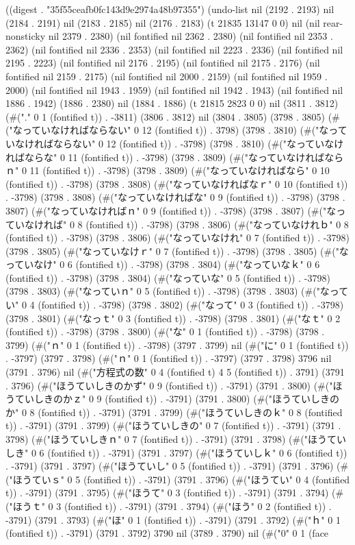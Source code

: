 
((digest . "35f55ceafb0fc143d9e2974a48b97355") (undo-list nil (2192 . 2193) nil (2184 . 2191) nil (2183 . 2185) nil (2176 . 2183) (t 21835 13147 0 0) nil (nil rear-nonsticky nil 2379 . 2380) (nil fontified nil 2362 . 2380) (nil fontified nil 2353 . 2362) (nil fontified nil 2336 . 2353) (nil fontified nil 2223 . 2336) (nil fontified nil 2195 . 2223) (nil fontified nil 2176 . 2195) (nil fontified nil 2175 . 2176) (nil fontified nil 2159 . 2175) (nil fontified nil 2000 . 2159) (nil fontified nil 1959 . 2000) (nil fontified nil 1943 . 1959) (nil fontified nil 1942 . 1943) (nil fontified nil 1886 . 1942) (1886 . 2380) nil (1884 . 1886) (t 21815 2823 0 0) nil (3811 . 3812) (#("." 0 1 (fontified t)) . -3811) (3806 . 3812) nil (3804 . 3805) (3798 . 3805) (#("なっていなければならない" 0 12 (fontified t)) . 3798) (3798 . 3810) (#("なっていなければならない" 0 12 (fontified t)) . -3798) (3798 . 3810) (#("なっていなければならな" 0 11 (fontified t)) . -3798) (3798 . 3809) (#("なっていなければならｎ" 0 11 (fontified t)) . -3798) (3798 . 3809) (#("なっていなければなら" 0 10 (fontified t)) . -3798) (3798 . 3808) (#("なっていなければなｒ" 0 10 (fontified t)) . -3798) (3798 . 3808) (#("なっていなければな" 0 9 (fontified t)) . -3798) (3798 . 3807) (#("なっていなければｎ" 0 9 (fontified t)) . -3798) (3798 . 3807) (#("なっていなければ" 0 8 (fontified t)) . -3798) (3798 . 3806) (#("なっていなけれｂ" 0 8 (fontified t)) . -3798) (3798 . 3806) (#("なっていなけれ" 0 7 (fontified t)) . -3798) (3798 . 3805) (#("なっていなけｒ" 0 7 (fontified t)) . -3798) (3798 . 3805) (#("なっていなけ" 0 6 (fontified t)) . -3798) (3798 . 3804) (#("なっていなｋ" 0 6 (fontified t)) . -3798) (3798 . 3804) (#("なっていな" 0 5 (fontified t)) . -3798) (3798 . 3803) (#("なっていｎ" 0 5 (fontified t)) . -3798) (3798 . 3803) (#("なってい" 0 4 (fontified t)) . -3798) (3798 . 3802) (#("なって" 0 3 (fontified t)) . -3798) (3798 . 3801) (#("なっｔ" 0 3 (fontified t)) . -3798) (3798 . 3801) (#("なｔ" 0 2 (fontified t)) . -3798) (3798 . 3800) (#("な" 0 1 (fontified t)) . -3798) (3798 . 3799) (#("ｎ" 0 1 (fontified t)) . -3798) (3797 . 3799) nil (#("に" 0 1 (fontified t)) . -3797) (3797 . 3798) (#("ｎ" 0 1 (fontified t)) . -3797) (3797 . 3798) 3796 nil (3791 . 3796) nil (#("方程式の数" 0 4 (fontified t) 4 5 (fontified t)) . 3791) (3791 . 3796) (#("ほうていしきのかず" 0 9 (fontified t)) . -3791) (3791 . 3800) (#("ほうていしきのかｚ" 0 9 (fontified t)) . -3791) (3791 . 3800) (#("ほうていしきのか" 0 8 (fontified t)) . -3791) (3791 . 3799) (#("ほうていしきのｋ" 0 8 (fontified t)) . -3791) (3791 . 3799) (#("ほうていしきの" 0 7 (fontified t)) . -3791) (3791 . 3798) (#("ほうていしきｎ" 0 7 (fontified t)) . -3791) (3791 . 3798) (#("ほうていしき" 0 6 (fontified t)) . -3791) (3791 . 3797) (#("ほうていしｋ" 0 6 (fontified t)) . -3791) (3791 . 3797) (#("ほうていし" 0 5 (fontified t)) . -3791) (3791 . 3796) (#("ほうていｓ" 0 5 (fontified t)) . -3791) (3791 . 3796) (#("ほうてい" 0 4 (fontified t)) . -3791) (3791 . 3795) (#("ほうて" 0 3 (fontified t)) . -3791) (3791 . 3794) (#("ほうｔ" 0 3 (fontified t)) . -3791) (3791 . 3794) (#("ほう" 0 2 (fontified t)) . -3791) (3791 . 3793) (#("ほ" 0 1 (fontified t)) . -3791) (3791 . 3792) (#("ｈ" 0 1 (fontified t)) . -3791) (3791 . 3792) 3790 nil (3789 . 3790) nil (#("0" 0 1 (face 